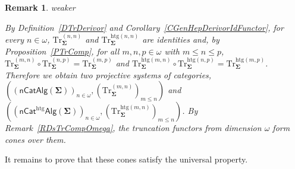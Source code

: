 \documentclass[a4paper, reqno]{amsbook}
\makeatletter
\newcommand{\sig}[1]{\mathbf{#1}}             %
\newcommand{\htg}{\mathrm{htg}}                %
\newcommand{\Tr}{\mathrm{Tr}}
\theoremstyle{plain}
\newtheorem{remark}[theorem]{Remark}
\theoremstyle{definition}
\newcommand*{\CA@leanpending}{}
\newcommand*{\CA@leanrelation}{}
\newcommand*{\lean}[2]{%
  \ifcsname\string\color@lean@#1\endcsname\else
    \PackageError{main}{Unknown relation `#1' in \string\lean}{Use equivalent, weaker or stronger.}%
  \fi
  \gdef\CA@leanrelation{#1}%
  \gdef\CA@leanpending{#2}}
\makeatother
\begin{document}
\begin{remark}\label{RTrProjSystem}\lean{weaker}{Limits.homogeneousSystem,Limits.heterogeneousSystem}
By Definition~\ref{DTrDerivor} and Corollary~\ref{CGenHepDerivorIdFunctor}, for every $n\in\omega$, $\Tr^{(n,n)}_{\sig{\Sigma}}$ and $\Tr^{\htg(n,n)}_{\sig{\Sigma}}$ are identities and, by Proposition~\ref{PTrComp}, for all $m,n,p\in\omega$ with $m\leq n\leq p$, $\Tr^{(m,n)}_{\sig{\Sigma}}\circ \Tr^{(n,p)}_{\sig{\Sigma}}=\Tr^{(m,p)}_{\sig{\Sigma}}$ and $\Tr^{\htg(m,n)}_{\sig{\Sigma}}\circ \Tr^{\htg(n,p)}_{\sig{\Sigma}}=\Tr^{\htg(m,p)}_{\sig{\Sigma}}$.
Therefore we obtain two projective systems of categories, $((\mathsf{nCatAlg}(\sig{\Sigma}))_{n\in\omega},(\Tr^{(m,n)}_{\sig{\Sigma}})_{m\leq n})$ and $((\mathsf{nCat}^{\htg}\mathsf{Alg}(\sig{\Sigma}))_{n\in\omega},(\Tr^{\htg(m,n)}_{\sig{\Sigma}})_{m\leq n})$.
By Remark~\ref{RDsTrCompOmega}, the truncation functors from dimension $\omega$ form cones over them.
\end{remark}

It remains to prove that these cones satisfy the universal property.
\end{document}
